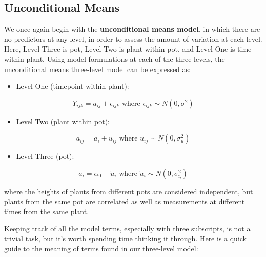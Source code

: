 \documentclass[
]{krantz}
\providecommand{\tightlist}{%
  \setlength{\itemsep}{0pt}\setlength{\parskip}{0pt}}
\begin{document}
\hypertarget{unconditional-means}{%
\subsection{Unconditional Means}\label{unconditional-means}}

We once again begin with the \textbf{unconditional means model},  in which there are no predictors at any level, in order to assess the amount of variation at each level. Here, Level Three is pot, Level Two is plant within pot, and Level One is time within plant. Using model formulations at each of the three levels, the unconditional means three-level model can be expressed as:

\begin{itemize}
\tightlist
\item
  Level One (timepoint within plant):
\end{itemize}

\begin{equation*}
Y_{ijk} = a_{ij}+\epsilon_{ijk} \textrm{ where } \epsilon_{ijk}\sim N(0,\sigma^2)
\end{equation*}

\begin{itemize}
\tightlist
\item
  Level Two (plant within pot):
\end{itemize}

\begin{equation*}
a_{ij} = a_{i}+u_{ij} \textrm{ where } u_{ij}\sim N(0,\sigma_{u}^{2})
\end{equation*}

\begin{itemize}
\tightlist
\item
  Level Three (pot):
\end{itemize}

\begin{equation*}
a_{i} = \alpha_{0}+\tilde{u}_{i} \textrm{ where } \tilde{u}_{i} \sim N(0,\sigma_{\tilde{u}}^{2})
\end{equation*}

where the heights of plants from different pots are considered independent, but plants from the same pot are correlated as well as measurements at different times from the same plant.

Keeping track of all the model terms, especially with three subscripts, is not a trivial task, but it's worth spending time thinking it through. Here is a quick guide to the meaning of terms found in our three-level model:
\end{document}
